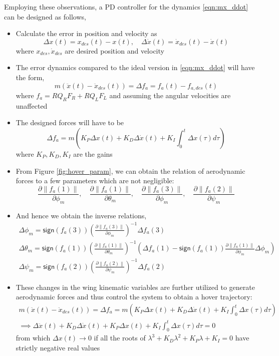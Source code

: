 \documentclass[10pt]{article}
\newcommand{\norm}[1]{\ensuremath{\left\| #1 \right\|}}
\newcommand{\sign}[1]{\ensuremath{\mathsf{sign} \left( #1 \right)}}
\begin{document}
Employing these observations, a PD controller for the dynamics \eqref{eqn:mx_ddot} can be designed as follows,
\begin{itemize}
	\item Calculate the error in position and velocity as
	\[ \Delta x(t) = x_{des}(t) - x(t),\quad \Delta \dot x(t) = \dot x_{des}(t) - \dot x(t) \]
	where $ x_{des}, \dot x_{des} $ are desired position and velocity
	\item The error dynamics compared to the ideal version in \eqref{eqn:mx_ddot} will have the form,
	\[ m (\ddot{x}(t) - \ddot{x}_{des}(t)) = \Delta f_a = f_a(t) - f_{a, des} (t)\]
	where $ f_a = R Q_R F_R + R Q_L F_L $ and assuming the angular velocities are unaffected
	\item The designed forces will have to be 
	\begin{equation} \label{eqn:PID_controller}
	\Delta f_a = m (K_P \Delta x (t) + K_D \Delta\dot x(t) + K_I \int_{0}^{t} \Delta x(\tau) d\tau)
	\end{equation}
	where $ K_P, K_D, K_I $ are the gains
	\item From Figure \ref{fig:hover_param}, we can obtain the relation of aerodynamic forces to a few parameters which are not negligible:
	\[ \frac{\partial \norm{f_a(1)}}{\partial \phi_m},\quad \frac{\partial \norm{f_a(1)}}{\partial \theta_m},\quad \frac{\partial \norm{f_a(3)}}{\partial \phi_m},\quad \frac{\partial \norm{f_a(2)}}{\partial \psi_m} \]
	\item And hence we obtain the inverse relations,
	\begin{gather*}
		\Delta \phi_m = \sign{f_a(3)} \left(\frac{\partial \norm{f_a(3)}}{\partial \phi_m} \right)^{-1} \Delta f_a(3) \\
		\Delta \theta_m = \sign{f_a(1)} \left( \frac{\partial \norm{f_a(1)}}{\partial \theta_m} \right)^{-1} \left(\Delta f_a(1) - \sign{f_a(1)} \frac{\partial \norm{f_a(1)}}{\partial \phi_m} \Delta \phi_m \right) \\
		\Delta \psi_m = \sign{f_a(2)} \left( \frac{\partial \norm{f_a(2)}}{\partial \psi_m} \right)^{-1} \Delta f_a(2)
	\end{gather*}
	\item These changes in the wing kinematic variables are further utilized to generate aerodynamic forces and thus control the system to obtain a hover trajectory:
	\begin{gather*}
		m (\ddot{x}(t) - \ddot{x}_{des}(t)) = \Delta f_a = m (K_P \Delta x (t) + K_D \Delta\dot x(t) + K_I \int_{0}^{t} \Delta x(\tau) d\tau) \\
		\implies \Delta \ddot{x}(t) + K_D \Delta\dot x(t) + K_P \Delta x (t) + K_I \int_{0}^{t} \Delta x(\tau) d\tau = 0
	\end{gather*}
	from which $ \Delta x(t) \to 0 $ if all the roots of $ \lambda^3 + K_D \lambda^2 + K_P \lambda + K_I = 0 $ have strictly negative real values
\end{itemize}
\end{document}
